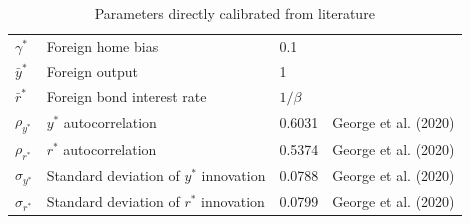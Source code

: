 \documentclass[12pt]{article}
\begin{document}
\begin{table}[h!]
\begin{tabular}{llll}
$\gamma^*$  & Foreign home bias              & 0.1                                             \\
$\bar{y}^*$  & Foreign output    & 1                                                            \\
$\bar{r}^*$   & Foreign bond interest rate           & $1/\beta$                                   \\
$\rho_{y^*}$  & $y^*$ autocorrelation  & 0.6031   &       George et al. (2020)                                \\
$\rho_{r^*}$   & $r^*$ autocorrelation  & 0.5374     &       George et al. (2020)                                \\
$\sigma_{y^*}$  & Standard deviation of $y^*$ innovation   & 0.0788    &       George et al. (2020)                                \\
$\sigma_{r^*}$  & Standard deviation of $r^*$ innovation & 0.0799    &       George et al. (2020)                                \\\hline
\end{tabular}
\caption{Parameters directly calibrated from literature}
\end{table}
\end{document}
